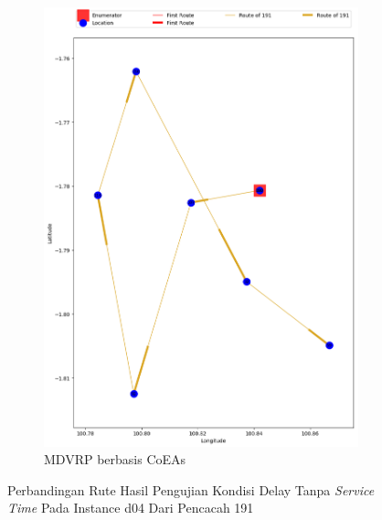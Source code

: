 \begin{figure}[H]
	\centering
	\begin{subfigure}[t]{\textwidth}
		\centering
		\includegraphics[width=\textwidth]{Resources/Images/delayed_4/real_m15_n100_delayed_4_191_coes}
		\caption{MDVRP berbasis CoEAs}
		\label{fig:real_m15_n100_delayed_4_191_coes}
	\end{subfigure}
	\caption{Perbandingan Rute Hasil Pengujian Kondisi Delay Tanpa \textit{Service Time} Pada Instance d04 Dari Pencacah 191}
	\label{fig:real_m15_n100_delayed_4_191}
\end{figure}


